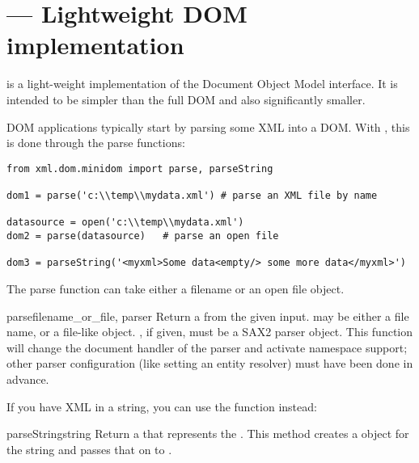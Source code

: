 \section{ ---
         Lightweight DOM implementation}



 is a light-weight implementation of the
Document Object Model interface.  It is intended to be
simpler than the full DOM and also significantly smaller.

DOM applications typically start by parsing some XML into a DOM.  With
, this is done through the parse functions:

\begin{verbatim}
from xml.dom.minidom import parse, parseString

dom1 = parse('c:\\temp\\mydata.xml') # parse an XML file by name

datasource = open('c:\\temp\\mydata.xml')
dom2 = parse(datasource)   # parse an open file

dom3 = parseString('<myxml>Some data<empty/> some more data</myxml>')
\end{verbatim}

The parse function can take either a filename or an open file object. 

\begin{funcdesc}{parse}{filename_or_file{, parser}}
  Return a  from the given input. 
  may be either a file name, or a file-like object. , if
  given, must be a SAX2 parser object. This function will change the
  document handler of the parser and activate namespace support; other
  parser configuration (like setting an entity resolver) must have been
  done in advance.
\end{funcdesc}

If you have XML in a string, you can use the
 function instead:

\begin{funcdesc}{parseString}{string}
  Return a  that represents the . This
  method creates a  object for the string and passes
  that on to .
\end{funcdesc}


